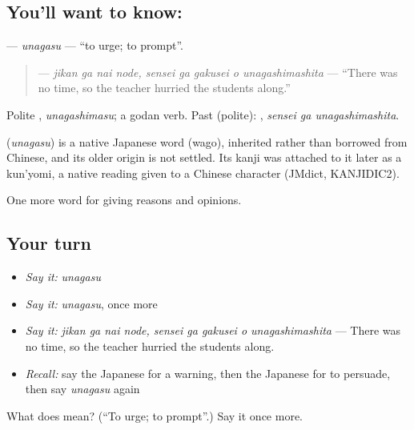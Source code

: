 \subsection*{You'll want to know: }
\textbf{} — \emph{unagasu} — \textquotedblleft{}to urge; to prompt\textquotedblright{}.

\begin{quote}
\textbf{   } — \emph{jikan ga nai node, sensei ga gakusei o unagashimashita} — \textquotedblleft{}There was no time, so the teacher hurried the students along.\textquotedblright{}
\end{quote}

Polite \textbf{}, \emph{unagashimasu}; a godan verb. Past (polite): \textbf{ }, \emph{sensei ga unagashimashita}.

\begin{cousinweb}
\textbf{} (\emph{unagasu}) is a native Japanese word (wago), inherited rather than borrowed from Chinese, and its older origin is not settled. Its kanji was attached to it later as a kun'yomi, a native reading given to a Chinese character (JMdict, KANJIDIC2).
\end{cousinweb}

\begin{grammarlens}[title={What you've built}]
One more word for giving reasons and opinions.
\end{grammarlens}

\subsection*{Your turn}
\begin{itemize}
\raggedright
  \item \emph{Say it:} \emph{unagasu}
  \item \emph{Say it:} \emph{unagasu}, once more
  \item \emph{Say it:} \emph{jikan ga nai node, sensei ga gakusei o unagashimashita} — There was no time, so the teacher hurried the students along.
  \item \emph{Recall:} say the Japanese for a warning, then the Japanese for to persuade, then say \emph{unagasu} again
\end{itemize}

\begin{tcolorbox}[breakable,colback=teal!4,colframe=teal!35!black,title={Before you move on}]
What does  mean? (\textquotedblleft{}To urge; to prompt\textquotedblright{}.) Say it once more.
\end{tcolorbox}
